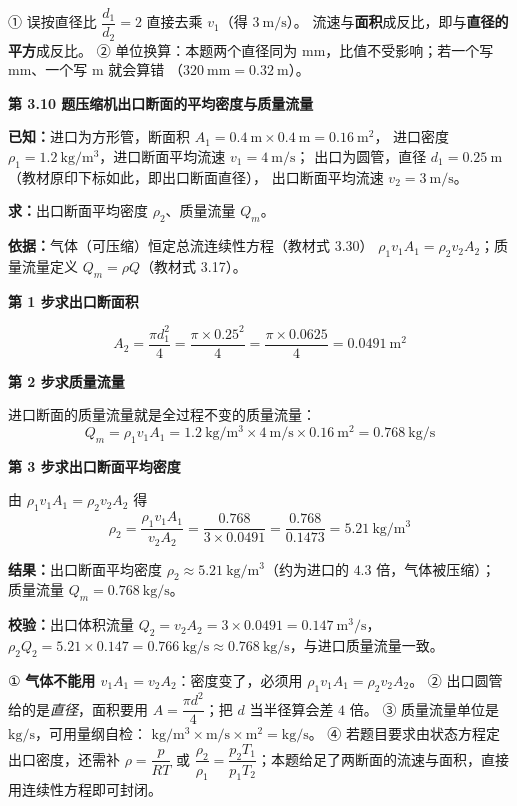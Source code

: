 \begin{yicuo}
① 误按直径比 $\dfrac{d_1}{d_2}=2$ 直接去乘 $v_1$（得 $3\ \mathrm{m/s}$）。
流速与\textbf{面积}成反比，即与\textbf{直径的平方}成反比。
② 单位换算：本题两个直径同为 mm，比值不受影响；若一个写 mm、一个写 m 就会算错
（$320\ \mathrm{mm}=0.32\ \mathrm{m}$）。
\end{yicuo}

\noindent\textbf{第 3.10 题\quad 压缩机出口断面的平均密度与质量流量}

\begin{jie}
\textbf{已知：}进口为方形管，断面积 $A_1=0.4\ \mathrm{m}\times0.4\ \mathrm{m}=0.16\ \mathrm{m^2}$，
进口密度 $\rho_1=1.2\ \mathrm{kg/m^3}$，进口断面平均流速 $v_1=4\ \mathrm{m/s}$；
出口为圆管，直径 $d_1=0.25\ \mathrm{m}$（教材原印下标如此，即出口断面直径），
出口断面平均流速 $v_2=3\ \mathrm{m/s}$。

\textbf{求：}出口断面平均密度 $\rho_2$、质量流量 $Q_m$。

\textbf{依据：}气体（可压缩）恒定总流连续性方程（教材式 3.30）
$\rho_1v_1A_1=\rho_2v_2A_2$；质量流量定义 $Q_m=\rho Q$（教材式 3.17）。

\textbf{第 1 步\quad 求出口断面积}

\[ A_2=\frac{\pi d_1^2}{4}=\frac{\pi\times0.25^2}{4}=\frac{\pi\times0.0625}{4}
   =0.0491\ \mathrm{m^2} \]

\textbf{第 2 步\quad 求质量流量}

进口断面的质量流量就是全过程不变的质量流量：
\[ Q_m=\rho_1v_1A_1=1.2\ \mathrm{kg/m^3}\times4\ \mathrm{m/s}\times0.16\ \mathrm{m^2}
   =0.768\ \mathrm{kg/s} \]

\textbf{第 3 步\quad 求出口断面平均密度}

由 $\rho_1v_1A_1=\rho_2v_2A_2$ 得
\[ \rho_2=\frac{\rho_1v_1A_1}{v_2A_2}=\frac{0.768}{3\times0.0491}=\frac{0.768}{0.1473}
   =5.21\ \mathrm{kg/m^3} \]

\textbf{结果：}出口断面平均密度 $\rho_2\approx5.21\ \mathrm{kg/m^3}$（约为进口的 $4.3$ 倍，气体被压缩）；
质量流量 $Q_m=0.768\ \mathrm{kg/s}$。

\textbf{校验：}出口体积流量 $Q_2=v_2A_2=3\times0.0491=0.147\ \mathrm{m^3/s}$，
$\rho_2Q_2=5.21\times0.147=0.766\ \mathrm{kg/s}\approx0.768\ \mathrm{kg/s}$，与进口质量流量一致。
\end{jie}

\begin{yicuo}
① \textbf{气体不能用 $v_1A_1=v_2A_2$}：密度变了，必须用 $\rho_1v_1A_1=\rho_2v_2A_2$。
② 出口圆管给的是\emph{直径}，面积要用 $A=\dfrac{\pi d^2}{4}$；把 $d$ 当半径算会差 $4$ 倍。
③ 质量流量单位是 $\mathrm{kg/s}$，可用量纲自检：
$\mathrm{kg/m^3}\times\mathrm{m/s}\times\mathrm{m^2}=\mathrm{kg/s}$。
④ 若题目要求由状态方程定出口密度，还需补 $\rho=\dfrac{p}{RT}$ 或
$\dfrac{\rho_2}{\rho_1}=\dfrac{p_2T_1}{p_1T_2}$；本题给足了两断面的流速与面积，直接用连续性方程即可封闭。
\end{yicuo}

